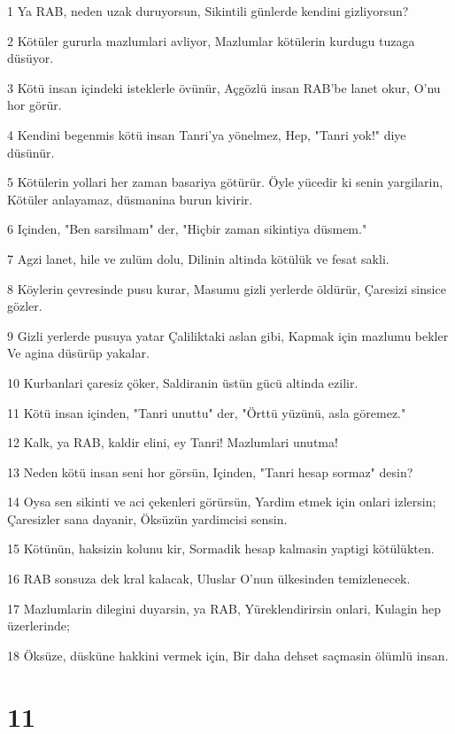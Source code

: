 \par 1 Ya RAB, neden uzak duruyorsun, Sikintili günlerde kendini gizliyorsun?
\par 2 Kötüler gururla mazlumlari avliyor, Mazlumlar kötülerin kurdugu tuzaga düsüyor.
\par 3 Kötü insan içindeki isteklerle övünür, Açgözlü insan RAB'be lanet okur, O'nu hor görür.
\par 4 Kendini begenmis kötü insan Tanri'ya yönelmez, Hep, "Tanri yok!" diye düsünür.
\par 5 Kötülerin yollari her zaman basariya götürür. Öyle yücedir ki senin yargilarin, Kötüler anlayamaz, düsmanina burun kivirir.
\par 6 Içinden, "Ben sarsilmam" der, "Hiçbir zaman sikintiya düsmem."
\par 7 Agzi lanet, hile ve zulüm dolu, Dilinin altinda kötülük ve fesat sakli.
\par 8 Köylerin çevresinde pusu kurar, Masumu gizli yerlerde öldürür, Çaresizi sinsice gözler.
\par 9 Gizli yerlerde pusuya yatar Çaliliktaki aslan gibi, Kapmak için mazlumu bekler Ve agina düsürüp yakalar.
\par 10 Kurbanlari çaresiz çöker, Saldiranin üstün gücü altinda ezilir.
\par 11 Kötü insan içinden, "Tanri unuttu" der, "Örttü yüzünü, asla göremez."
\par 12 Kalk, ya RAB, kaldir elini, ey Tanri! Mazlumlari unutma!
\par 13 Neden kötü insan seni hor görsün, Içinden, "Tanri hesap sormaz" desin?
\par 14 Oysa sen sikinti ve aci çekenleri görürsün, Yardim etmek için onlari izlersin; Çaresizler sana dayanir, Öksüzün yardimcisi sensin.
\par 15 Kötünün, haksizin kolunu kir, Sormadik hesap kalmasin yaptigi kötülükten.
\par 16 RAB sonsuza dek kral kalacak, Uluslar O'nun ülkesinden temizlenecek.
\par 17 Mazlumlarin dilegini duyarsin, ya RAB, Yüreklendirirsin onlari, Kulagin hep üzerlerinde;
\par 18 Öksüze, düsküne hakkini vermek için, Bir daha dehset saçmasin ölümlü insan.

\chapter{11}

